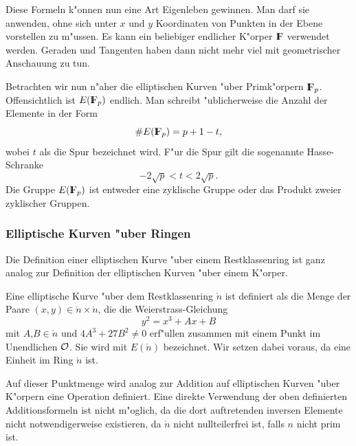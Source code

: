 Diese Formeln k"onnen nun eine Art Eigenleben gewinnen. Man darf sie
anwenden, ohne sich unter $x$ und $y$ Koordinaten von Punkten in der
Ebene vorstellen zu m"ussen. Es kann ein beliebiger
endlicher K"orper $\F$ verwendet werden. Geraden und Tangenten haben dann 
nicht mehr viel mit geometrischer Anschauung zu tun.

Betrachten wir nun n"aher die elliptischen Kurven "uber Primk"orpern
$\F_p$. Offensichtlich ist $E(\F_p)$ endlich. Man schreibt
"ublicherweise die Anzahl der Elemente in der Form
$$ \# E(\F_p) = p+1-t, $$ wobei $t$ als die Spur bezeichnet wird. F"ur
die Spur gilt die sogenannte Hasse-Schranke
$$ -2\sqrt{p} < t < 2\sqrt{p}. $$ 
Die Gruppe $E(\F_p)$ ist entweder eine zyklische Gruppe oder das
Produkt zweier zyklischer Gruppen.



\subsubsection{Elliptische Kurven "uber Ringen}

Die Definition einer elliptischen Kurve "uber einem Restklassenring
ist ganz analog zur Definition der elliptischen Kurven "uber einem
K"orper.

\begin{definition}
  Eine elliptische Kurve "uber dem Restklassenring $\ring{n}$ ist definiert
  als die Menge der Paare $(x,y)\in\ring{n} \times \ring{n}$, die die
  Weierstrass-Gleichung
  $$ y^2 = x^3 + Ax + B $$
  mit $A$,$B\in\ring{n}$ und $4A^3 + 27B^2 \neq 0$ erf"ullen zusammen
  mit einem Punkt im Unendlichen ${\cal O}$. Sie wird mit
  $E(\ring{n})$ bezeichnet. Wir setzen dabei voraus, da eine
  Einheit im Ring $\ring{n}$ ist.
\end{definition}

Auf dieser Punktmenge wird analog zur Addition auf elliptischen Kurven
"uber K"orpern eine Operation definiert. Eine direkte Verwendung der
oben definierten Additionsformeln ist nicht m"oglich, da die dort
auftretenden inversen Elemente nicht notwendigerweise existieren, da
$\ring{n}$ nicht nullteilerfrei ist, falls $n$ nicht prim ist.

